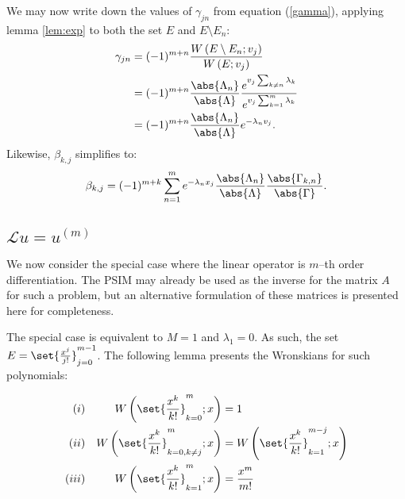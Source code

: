 \documentclass{article}
\begin{document}
We may now write down the values of $\gamma_{jn}$ from equation (\ref{gamma}), applying lemma \ref{lem:exp} to both the set $E$ and $E \setminus E_n$:
\begin{equation*}
\begin{split}
\gamma_{jn} & = (-1)^{m+n} \frac{\W{E \setminus E_n}{v_j}}{\W{E}{v_j}} \\
			& = (-1)^{m+n} \frac{\abs{\Lambda_n}}{\abs{\Lambda}} \frac{e^{v_j \sum_{k \neq n} \lambda_k}}{e^{v_j \sum_{k=1}^m \lambda_k}} \\
			& = (-1)^{m+n} \frac{\abs{\Lambda_n}}{\abs{\Lambda}} e^{-\lambda_n v_j} .
\end{split}
\end{equation*}
Likewise, $\beta_{k,j}$ simplifies to:
\begin{equation*}
\beta_{k,j} = (-1)^{m+k} \sum_{n=1}^m e^{-\lambda_n x_j} \frac{\abs{\Lambda_n}}{\abs{\Lambda}} \frac{\abs{\Gamma_{k,n}}}{\abs{\Gamma}} .
\end{equation*}

\subsection{$\mathcal{L} u = u^{(m)}$}

\newcommand{\Wpoly}[2]{\W{\set{\Poly{k}}_{#1}^{#2}}{x}}

We now consider the special case where the linear operator is $m$--th order differentiation.
The PSIM may already be used as the inverse for the matrix $A$ for such a problem, but an alternative formulation of these matrices is presented here for completeness.

The special case is equivalent to $M=1$ and $\lambda_1 = 0$.
As such, the set $E = \set{\Poly{j}}_{j=0}^{m-1}$.
The following lemma presents the Wronskians for such polynomials:

\begin{lemma}
\begin{align*}
(i) && \Wpoly{k=0}{m} & = 1 \\
(ii) && \Wpoly{k=0,k \neq j}{m} & = \Wpoly{k=1}{m-j} \\
(iii) && \Wpoly{k=1}{m} & = \Poly{m}
\end{align*}
\label{lem:poly}
\end{lemma}
\end{document}

